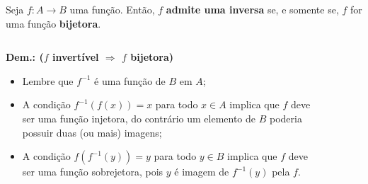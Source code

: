 \begin{frame}
  \begin{theorem}
    Seja $f:A\rightarrow B$ uma função. Então, $f$ \textbf{admite uma inversa} se, e somente se, $f$ for uma função \textbf{bijetora}.
  \end{theorem}
  \begin{columns}[onlytextwidth]
    \begin{column}{0.49\textwidth}
      \begin{highlight}
        \textbf{Dem.: ($f$ invertível $\Rightarrow$ $f$ bijetora)}
        \begin{itemize}
          \item Lembre que $f^{-1}$ é uma função de $B$ em $A$;
          \item A condição $f^{-1}(f(x))=x$ para todo $x\in A$ implica que $f$ deve ser uma função injetora, do contrário um elemento de $B$ poderia possuir duas (ou mais) imagens;
          \item A condição $f(f^{-1}(y))=y$ para todo $y\in B$ implica que $f$ deve ser uma função sobrejetora, pois $y$ é imagem de $f^{-1}(y)$ pela $f$.
        \end{itemize}
      \end{highlight}
    \end{column}
    \begin{column}{0.49\textwidth}
      \begin{figure}
      \end{figure}
    \end{column}
  \end{columns}
\end{frame}


